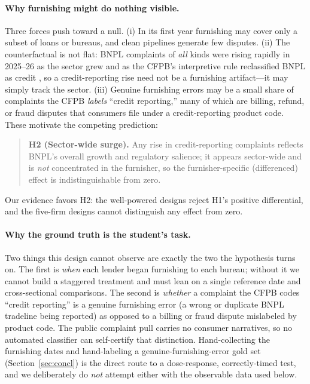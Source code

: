 \documentclass[12pt]{article}
\begin{document}
\paragraph{Why furnishing might do nothing visible.} Three forces push toward a null. (i) In
its first year furnishing may cover only a subset of loans or bureaus, and clean pipelines
generate few disputes. (ii) The counterfactual is not flat: BNPL complaints of \emph{all}
kinds were rising rapidly in 2025--26 as the sector grew and as the CFPB's interpretive rule
reclassified BNPL as credit \citep{cfpb2024}, so a credit-reporting rise need not be a
furnishing artifact---it may simply track the sector. (iii) Genuine furnishing errors may be a
small share of complaints the CFPB \emph{labels} ``credit reporting,'' many of which are
billing, refund, or fraud disputes that consumers file under a credit-reporting product code.
These motivate the competing prediction:
\begin{quote}
\textbf{H2 (Sector-wide surge).} Any rise in credit-reporting complaints reflects BNPL's
overall growth and regulatory salience; it appears sector-wide and is \emph{not} concentrated
in the furnisher, so the furnisher-specific (differenced) effect is indistinguishable from
zero.
\end{quote}
Our evidence favors H2: the well-powered designs reject H1's positive differential, and the
five-firm designs cannot distinguish any effect from zero.

\paragraph{Why the ground truth is the student's task.} Two things this design cannot observe
are exactly the two the hypothesis turns on. The first is \emph{when} each lender began
furnishing to each bureau; without it we cannot build a staggered treatment and must lean on a
single reference date and cross-sectional comparisons. The second is \emph{whether} a complaint
the CFPB codes ``credit reporting'' is a genuine furnishing error (a wrong or duplicate BNPL
tradeline being reported) as opposed to a billing or fraud dispute mislabeled by product code.
The public complaint pull carries no consumer narratives, so no automated classifier can
self-certify that distinction. Hand-collecting the furnishing dates and hand-labeling a
genuine-furnishing-error gold set (Section~\ref{sec:concl}) is the direct route to a
dose-response, correctly-timed test, and we deliberately do \emph{not} attempt either with the
observable data used below.
\end{document}
